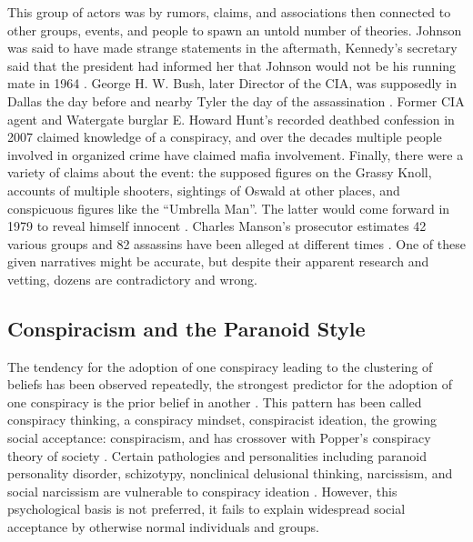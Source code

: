 This group of actors was by rumors, claims, and associations then connected to other groups, events, and people to spawn an untold number of theories. 
Johnson was said to have made strange statements in the aftermath, Kennedy's secretary said that the president had informed her that Johnson would not be his running mate in 1964 \cite{gagne2022}.
George H. W. Bush, later Director of the CIA, was supposedly in Dallas the day before and nearby Tyler the day of the assassination \cite[p. 54]{baker2010}.
Former CIA agent and Watergate burglar E. Howard Hunt's recorded deathbed confession in 2007 claimed knowledge of a conspiracy, and over the decades multiple people involved in organized crime have claimed mafia involvement. 
Finally, there were a variety of claims about the event: the supposed figures on the Grassy Knoll, accounts of multiple shooters, sightings of Oswald at other places, and conspicuous figures like the ``Umbrella Man''.
The latter would come forward in 1979 to reveal himself innocent \cite{gagne2022}.
Charles Manson's prosecutor estimates 42 various groups and 82 assassins have been alleged at different times \cite{patterson2013}.
One of these given narratives might be accurate, but despite their apparent research and vetting, dozens are contradictory and wrong.

\subsection{Conspiracism and the Paranoid Style}

The tendency for the adoption of one conspiracy leading to the clustering of beliefs has been observed repeatedly, the strongest predictor for the adoption of one conspiracy is the prior belief in another \cite[p. 953]{oliver2014}.
This pattern has been called conspiracy thinking, a conspiracy mindset, conspiracist ideation, the growing social acceptance: conspiracism, and has crossover with Popper's conspiracy theory of society \cite[p. 5]{douglas2019} \cite[p. 953]{oliver2014}.
Certain pathologies and personalities including paranoid personality disorder, schizotypy, nonclinical delusional thinking, narcissism, and social narcissism are vulnerable to conspiracy ideation \cite{zonis1994} \cite{barron2014} \cite[p. 8]{douglas2019}.
However, this psychological basis is not preferred, it fails to explain widespread social acceptance by otherwise normal individuals and groups.  

